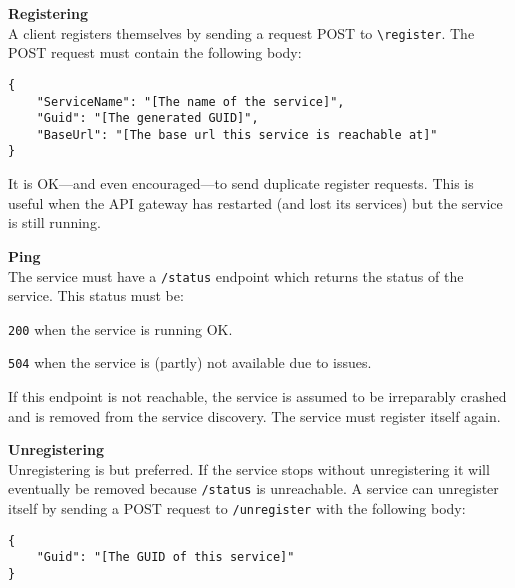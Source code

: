 \begin{teenumerate}
    \item \textbf{Registering}\\
    A client registers themselves by sending a request POST to \texttt{\textbackslash{}register}. The POST request must contain the following body:
    \begin{lstlisting}[style=teunknown]
{
    "ServiceName": "[The name of the service]",
    "Guid": "[The generated GUID]",
    "BaseUrl": "[The base url this service is reachable at]"
}
    \end{lstlisting}
    It is OK---and even encouraged---to send duplicate register requests. This is useful when the API gateway has restarted (and lost its services) but the service is still running.
    \item \textbf{Ping}\\
    The service must have a \texttt{/status} endpoint which returns the status of the service. This status must be:
    \begin{teitemize}
        \item \texttt{200} when the service is running OK.
        \item \texttt{504} when the service is (partly) not available due to issues.
    \end{teitemize} 
    If this endpoint is not reachable, the service is assumed to be irreparably crashed and is removed from the service discovery. The service must register itself again.
    \item \textbf{Unregistering}\\
    Unregistering is  but preferred. If the service stops without unregistering it will eventually be removed because \texttt{/status} is unreachable. A service can unregister itself by sending a POST request to \texttt{/unregister} with the following body:
    \begin{lstlisting}[style=teunknown]
{
    "Guid": "[The GUID of this service]"
}
    \end{lstlisting} 
\end{teenumerate}